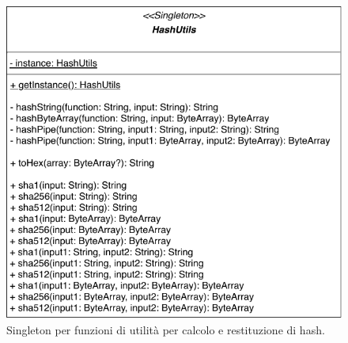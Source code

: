 	\begin{figure}
		\centering
		\includegraphics[scale=0.65]{figure/HashUtils.pdf}
		\caption{Singleton per funzioni di utilità per calcolo e restituzione di hash.}\label{fig:hashUtils}
	\end{figure}

